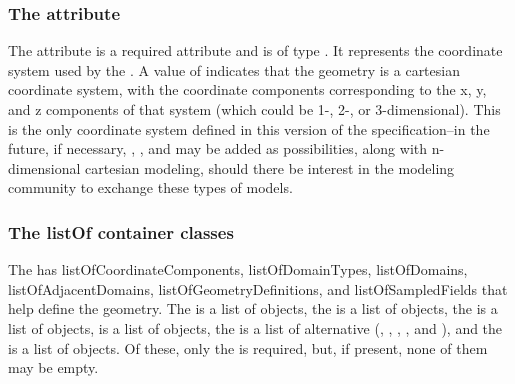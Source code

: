 \subsubsection{The \fixttspace{} attribute}
The  attribute is a required attribute and is of type . It represents the coordinate system used by the \Geometry.  A value of   indicates that the geometry is a cartesian coordinate system, with the coordinate components corresponding to the x, y, and z components of that system (which could be 1-, 2-, or 3-dimensional).  This is the only coordinate system defined in this version of the specification--in the future, if necessary, , , and  may be added as possibilities, along with n-dimensional cartesian modeling, should there be interest in the modeling community to exchange these types of models.


\subsubsection{The listOf container classes}
The \Geometry has listOfCoordinateComponents, listOfDomainTypes, listOfDomains, listOfAdjacentDomains, listOfGeometryDefinitions, and listOfSampledFields that help define the geometry.  The \ListOfCoordinateComponents is a list of \CoordinateComponent objects, the \ListOfDomainTypes is a list of \DomainType objects, the \ListOfDomains is a list of \Domain objects, \ListOfAdjacentDomains is a list of \AdjacentDomains objects, the \ListOfGeometryDefinitions is a list of alternative \GeometryDefinitions (\ParametricGeometry, \CSGeometry, \SampledFieldGeometry, \AnalyticGeometry, and \MixedGeometry), and the \ListOfSampledFields is a list of \SampledField objects.  Of these, only the \ListOfCoordinateComponents is required, but, if present, none of them may be empty.

